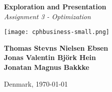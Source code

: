 \begin{titlepage}
    \begin{center}
        \vspace*{1cm}
        \linespread{1.5}

        \Huge
        \textbf{Exploration and Presentation}\\
        \Large
        \emph{Assignment 3 - Optimization}

        
        \vfill

        \texttt{[image: cphbusiness-small.png]}

        \vfill

        \textbf{Thomas Stevns Nielsen Ebsen}\\
        \textbf{Jonas Valentin Björk Hein}\\
        \textbf{Jonatan Magnus Bakkke}

        \vspace{1.5cm}
        Denmark, \today

        \linespread{1}
    \end{center}
\end{titlepage}